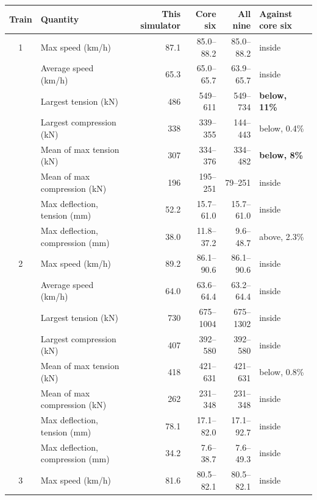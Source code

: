 \begin{table}[p]
    \centering
    \footnotesize
    \setlength{\tabcolsep}{3.5pt}
    \begin{tabular}{clrrrl}
        \toprule
        Train & Quantity & This simulator & Core six & All nine & Against core six \\
        \midrule
        1 & Max speed (km/h)               & 87.1  & 85.0--88.2   & 85.0--88.2   & inside \\
          & Average speed (km/h)           & 65.3  & 65.0--65.7   & 63.9--65.7   & inside \\
          & Largest tension (kN)           & 486   & 549--611     & 549--734     & \textbf{below, 11\%} \\
          & Largest compression (kN)       & 338   & 339--355     & 144--443     & below, 0.4\% \\
          & Mean of max tension (kN)       & 307   & 334--376     & 334--482     & \textbf{below, 8\%} \\
          & Mean of max compression (kN)   & 196   & 195--251     & 79--251      & inside \\
          & Max deflection, tension (mm)   & 52.2  & 15.7--61.0   & 15.7--61.0   & inside \\
          & Max deflection, compression (mm) & 38.0 & 11.8--37.2  & 9.6--48.7    & above, 2.3\% \\
        \midrule
        2 & Max speed (km/h)               & 89.2  & 86.1--90.6   & 86.1--90.6   & inside \\
          & Average speed (km/h)           & 64.0  & 63.6--64.4   & 63.2--64.4   & inside \\
          & Largest tension (kN)           & 730   & 675--1004    & 675--1302    & inside \\
          & Largest compression (kN)       & 407   & 392--580     & 392--580     & inside \\
          & Mean of max tension (kN)       & 418   & 421--631     & 421--631     & below, 0.8\% \\
          & Mean of max compression (kN)   & 262   & 231--348     & 231--348     & inside \\
          & Max deflection, tension (mm)   & 78.1  & 17.1--82.0   & 17.1--92.7   & inside \\
          & Max deflection, compression (mm) & 34.2 & 7.6--38.7   & 7.6--49.3    & inside \\
        \midrule
        3 & Max speed (km/h)               & 81.6  & 80.5--82.1   & 80.5--82.1   & inside \\

\end{tabular}
\end{table}
